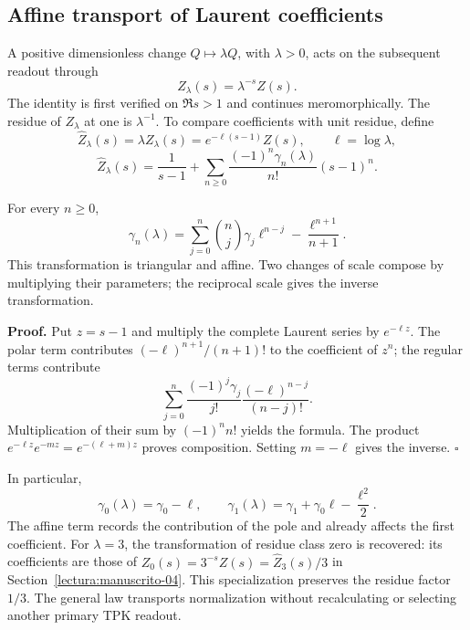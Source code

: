 \subsection{Affine transport of Laurent coefficients}
\label{ix-add:stieltjes}

A positive dimensionless change $Q\mapsto\lambda Q$, with
$\lambda>0$, acts on the subsequent readout through
\[
 Z_\lambda(s)=\lambda^{-s}Z(s).
\]
The identity is first verified on $\Re s>1$ and continues
meromorphically. The residue of $Z_\lambda$ at one is $\lambda^{-1}$.
To compare coefficients with unit residue, define
\[
 \widehat Z_\lambda(s)=\lambda Z_\lambda(s)
 =e^{-\ell(s-1)}Z(s),\qquad \ell=\log\lambda,
\]
\[
 \widehat Z_\lambda(s)=\frac1{s-1}
 +\sum_{n\geq0}\frac{(-1)^n\gamma_n(\lambda)}{n!}(s-1)^n.
\]

For every $n\geq0$,
\[
 \gamma_n(\lambda)=
 \sum_{j=0}^{n}\binom nj\gamma_j\ell^{n-j}
 -\frac{\ell^{n+1}}{n+1}.
\]
This transformation is triangular and affine. Two changes of scale
compose by multiplying their parameters; the reciprocal scale gives
the inverse transformation.

\textbf{Proof.} Put $z=s-1$ and multiply the complete Laurent series
by $e^{-\ell z}$. The polar term contributes
$(-\ell)^{n+1}/(n+1)!$ to the coefficient of $z^n$; the regular terms
contribute
\[
 \sum_{j=0}^n\frac{(-1)^j\gamma_j}{j!}
                    \frac{(-\ell)^{n-j}}{(n-j)!}.
\]
Multiplication of their sum by $(-1)^nn!$ yields the formula. The
product $e^{-\ell z}e^{-mz}=e^{-(\ell+m)z}$ proves composition.
Setting $m=-\ell$ gives the inverse. \hfill$\square$

In particular,
\[
 \gamma_0(\lambda)=\gamma_0-\ell,\qquad
 \gamma_1(\lambda)=\gamma_1+\gamma_0\ell-\frac{\ell^2}{2}.
\]
The affine term records the contribution of the pole and already
affects the first coefficient. For $\lambda=3$, the transformation of
residue class zero is recovered: its coefficients are those of
$Z_0(s)=3^{-s}Z(s)=\widehat Z_3(s)/3$ in
Section~\ref{lectura:manuscrito-04}. This specialization preserves
the residue factor $1/3$. The general law transports normalization
without recalculating or selecting another primary TPK readout.
